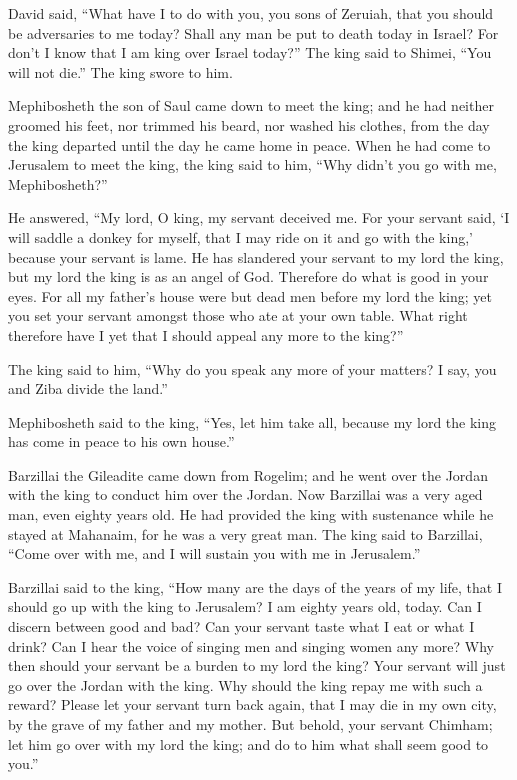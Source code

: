  David said, ``What have I to do with you, you sons of
Zeruiah, that you should be adversaries to me today? Shall any man be
put to death today in Israel? For don't I know that I am king over
Israel today?''  The king said to Shimei, ``You will not
die.'' The king swore to him.

 Mephibosheth the son of Saul came down to meet the king;
and he had neither groomed his feet, nor trimmed his beard, nor washed
his clothes, from the day the king departed until the day he came home
in peace.  When he had come to Jerusalem to meet the king,
the king said to him, ``Why didn't you go with me, Mephibosheth?''

 He answered, ``My lord, O king, my servant deceived me.
For your servant said, `I will saddle a donkey for myself, that I may
ride on it and go with the king,' because your servant is lame.
 He has slandered your servant to my lord the king, but my
lord the king is as an angel of God. Therefore do what is good in your
eyes.  For all my father's house were but dead men before
my lord the king; yet you set your servant amongst those who ate at your
own table. What right therefore have I yet that I should appeal any more
to the king?''

 The king said to him, ``Why do you speak any more of your
matters? I say, you and Ziba divide the land.''

 Mephibosheth said to the king, ``Yes, let him take all,
because my lord the king has come in peace to his own house.''

 Barzillai the Gileadite came down from Rogelim; and he
went over the Jordan with the king to conduct him over the Jordan.
 Now Barzillai was a very aged man, even eighty years old.
He had provided the king with sustenance while he stayed at Mahanaim,
for he was a very great man.  The king said to Barzillai,
``Come over with me, and I will sustain you with me in Jerusalem.''

 Barzillai said to the king, ``How many are the days of the
years of my life, that I should go up with the king to Jerusalem?
 I am eighty years old, today. Can I discern between good
and bad? Can your servant taste what I eat or what I drink? Can I hear
the voice of singing men and singing women any more? Why then should
your servant be a burden to my lord the king?  Your servant
will just go over the Jordan with the king. Why should the king repay me
with such a reward?  Please let your servant turn back
again, that I may die in my own city, by the grave of my father and my
mother. But behold, your servant Chimham; let him go over with my lord
the king; and do to him what shall seem good to you.''

